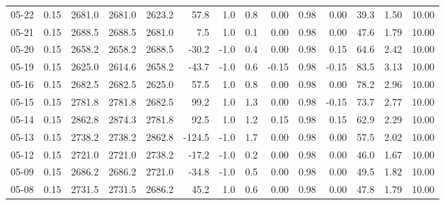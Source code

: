\begin{threeparttable}
{\begin{tabular}{lrrrrrrrrrrrrr}
  05-22 &     0.15 & 2681.0 & 2681.0 & 2623.2 &       57.8 &                      1.0 &                 0.8 &       0.00 &      0.98 &           0.00 &             39.3 &            1.50 &                  10.00 \\
  05-21 &     0.15 & 2688.5 & 2688.5 & 2681.0 &        7.5 &                      1.0 &                 0.1 &       0.00 &      0.98 &           0.00 &             47.6 &            1.79 &                  10.00 \\
  05-20 &     0.15 & 2658.2 & 2658.2 & 2688.5 &      -30.2 &                     -1.0 &                 0.4 &       0.00 &      0.98 &           0.15 &             64.6 &            2.42 &                  10.00 \\
  05-19 &     0.15 & 2625.0 & 2614.6 & 2658.2 &      -43.7 &                     -1.0 &                 0.6 &      -0.15 &      0.98 &          -0.15 &             83.5 &            3.13 &                  10.00 \\
  05-16 &     0.15 & 2682.5 & 2682.5 & 2625.0 &       57.5 &                      1.0 &                 0.8 &       0.00 &      0.98 &           0.00 &             78.2 &            2.96 &                  10.00 \\
  05-15 &     0.15 & 2781.8 & 2781.8 & 2682.5 &       99.2 &                      1.0 &                 1.3 &       0.00 &      0.98 &          -0.15 &             73.7 &            2.77 &                  10.00 \\
  05-14 &     0.15 & 2862.8 & 2874.3 & 2781.8 &       92.5 &                      1.0 &                 1.2 &       0.15 &      0.98 &           0.15 &             62.9 &            2.29 &                  10.00 \\
  05-13 &     0.15 & 2738.2 & 2738.2 & 2862.8 &     -124.5 &                     -1.0 &                 1.7 &       0.00 &      0.98 &           0.00 &             57.5 &            2.02 &                  10.00 \\
  05-12 &     0.15 & 2721.0 & 2721.0 & 2738.2 &      -17.2 &                     -1.0 &                 0.2 &       0.00 &      0.98 &           0.00 &             46.0 &            1.67 &                  10.00 \\
  05-09 &     0.15 & 2686.2 & 2686.2 & 2721.0 &      -34.8 &                     -1.0 &                 0.5 &       0.00 &      0.98 &           0.00 &             49.5 &            1.82 &                  10.00 \\
  05-08 &     0.15 & 2731.5 & 2731.5 & 2686.2 &       45.2 &                      1.0 &                 0.6 &       0.00 &      0.98 &           0.00 &             47.8 &            1.79 &                  10.00 \\

\end{tabular}}
\end{threeparttable}
